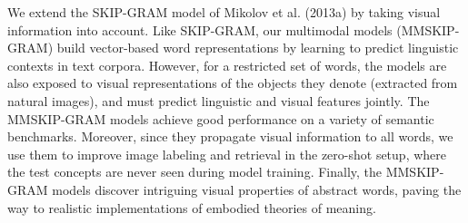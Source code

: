 We extend the SKIP-GRAM model of Mikolov et al. (2013a) by taking visual information into account. Like SKIP-GRAM, our multimodal models (MMSKIP-GRAM) build vector-based word representations by learning to predict linguistic contexts in text corpora. However, for a restricted set of words, the models are also exposed to visual representations of the objects they denote (extracted from natural images), and must predict linguistic and visual features jointly. The MMSKIP-GRAM models achieve good performance on a variety of semantic benchmarks. Moreover, since they propagate visual information to all words, we use them to improve image labeling and retrieval in the zero-shot setup, where the test concepts are never seen during model training. Finally, the MMSKIP-GRAM models discover intriguing visual properties of abstract words, paving the way to realistic implementations of embodied theories of meaning.

